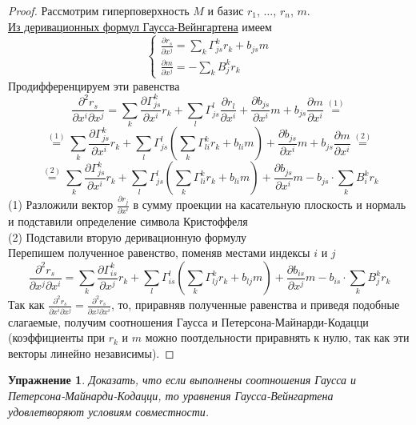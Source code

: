 \documentclass[12pt]{article}
\theoremstyle{plain}
\newtheorem*{exercise}{Упражнение}
\begin{document}
    \begin{proof}
        Рассмотрим гиперповерхность $M$ и базис $r_1$, $\ldots$, $r_n$, $m$.\\
        \hyperlink{8}{Из деривационных формул Гаусса-Вейнгартена} имеем $$\begin{cases}
            \frac{\partial r_s}{\partial x^j}=\sum\limits_{k}\Gamma_{js}^kr_k+b_{js}m\\
            \frac{\partial m}{\partial x^j}=-\sum\limits_{k}B_j^kr_k
        \end{cases}$$
        Продифференцируем эти равенства
        $$\frac{\partial^2 r_s}{\partial x^i\partial x^j}=\sum\limits_{k}\frac{\partial\Gamma_{js}^k}{\partial x^i}r_k+\sum\limits_{l}\Gamma_{js}^l\frac{\partial r_l}{\partial x^i}+\frac{\partial b_{js}}{\partial x^i}m+b_{js}\frac{\partial m}{\partial x^i}\overset{(1)}{=}$$
        $$\overset{(1)}{=}\sum\limits_{k}\frac{\partial\Gamma_{js}^k}{\partial x^i}r_k+\sum\limits_{l}\Gamma_{js}^l\left(\sum\limits_k\Gamma^k_{li}r_k+b_{li}m\right)+\frac{\partial b_{js}}{\partial x^i}m+b_{js}\frac{\partial m}{\partial x^i}\overset{(2)}{=}$$
        $$\overset{(2)}{=}\sum\limits_{k}\frac{\partial\Gamma_{js}^k}{\partial x^i}r_k+\sum\limits_{l}\Gamma_{js}^l\left(\sum\limits_k\Gamma^k_{li}r_k+b_{li}m\right)+\frac{\partial b_{js}}{\partial x^i}m-b_{js}\cdot\sum\limits_{k}B_i^kr_k$$
        (1) Разложили вектор $\frac{\partial r_j}{\partial x^i}$ в сумму проекции на касательную плоскость и нормаль и подставили определение символа Кристоффеля\\
        (2) Подставили вторую деривационную формулу\\
        Перепишем полученное равенство, поменяв местами индексы $i$ и $j$
        $$\frac{\partial^2 r_s}{\partial x^j\partial x^i}=\sum\limits_{k}\frac{\partial\Gamma_{is}^k}{\partial x^j}r_k+\sum\limits_{l}\Gamma_{is}^l\left(\sum\limits_k\Gamma^k_{lj}r_k+b_{lj}m\right)+\frac{\partial b_{is}}{\partial x^j}m-b_{is}\cdot\sum\limits_{k}B_j^kr_k$$
        Так как $\frac{\partial^2 r_s}{\partial x^i\partial x^j}=\frac{\partial^2 r_s}{\partial x^j\partial x^i}$, то, приравняв полученные равенства и приведя подобные слагаемые, получим соотношения Гаусса и Петерсона-Майнарди-Кодацци (коэффициенты при $r_k$ и $m$ можно поотдельности приравнять к нулю, так как эти векторы линейно независимы).
    \end{proof}
    \begin{exercise}
        Доказать, что если выполнены соотношения Гаусса и Петерсона-Майнарди-Кодацци, то уравнения Гаусса-Вейнгартена удовлетворяют условиям совместности.
    \end{exercise}
\end{document}
